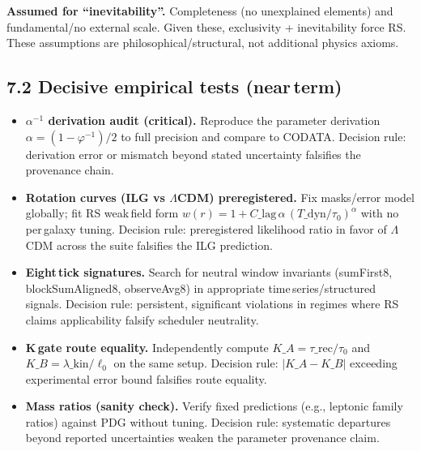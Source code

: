 \documentclass[11pt]{article}
\begin{document}
\textbf{Assumed for “inevitability”.} Completeness (no unexplained elements) and fundamental/no external scale. Given these, exclusivity + inevitability force RS. These assumptions are philosophical/structural, not additional physics axioms.

\subsection*{7.2 Decisive empirical tests (near\,term)}
\begin{itemize}[leftmargin=*]
  \item \textbf{$\alpha^{-1}$ derivation audit (critical).} Reproduce the parameter derivation $\alpha=(1-\varphi^{-1})/2$ to full precision and compare to CODATA. Decision rule: derivation error or mismatch beyond stated uncertainty falsifies the provenance chain.
  \item \textbf{Rotation curves (ILG vs $\Lambda$CDM) preregistered.} Fix masks/error model globally; fit RS weak\,field form $w(r)=1+C\_{\!\mathrm{lag}}\,\alpha\,(T\_{\!\mathrm{dyn}}/\tau_0)^{\alpha}$ with no per\,galaxy tuning. Decision rule: preregistered likelihood ratio in favor of $\Lambda$CDM across the suite falsifies the ILG prediction.
  \item \textbf{Eight\,tick signatures.} Search for neutral window invariants (sumFirst8, blockSumAligned8, observeAvg8) in appropriate time\,series/structured signals. Decision rule: persistent, significant violations in regimes where RS claims applicability falsify scheduler neutrality.
  \item \textbf{K\,gate route equality.} Independently compute $K\_A=\tau\_{\!\mathrm{rec}}/\tau_0$ and $K\_B=\lambda\_{\!\mathrm{kin}}/\ell_0$ on the same setup. Decision rule: $|K\_A-K\_B|$ exceeding experimental error bound falsifies route equality.
  \item \textbf{Mass ratios (sanity check).} Verify fixed predictions (e.g., leptonic family ratios) against PDG without tuning. Decision rule: systematic departures beyond reported uncertainties weaken the parameter provenance claim.
\end{itemize}
\end{document}
